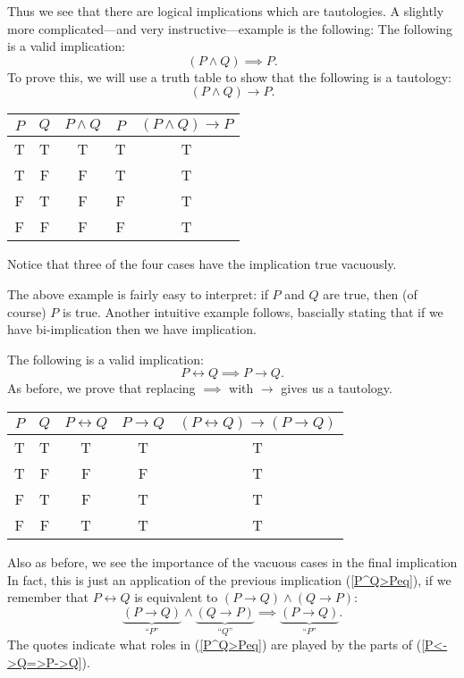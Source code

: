 Thus we see that there are logical 
%
implications which are 
%
tautologies.  A slightly 
more complicated---and very instructive---example is the following: 
\bex The following is a valid implication: 
\begin{equation}(P\wedge Q)\implies P.\label{P^Q>Peq}\end{equation}    
To prove this, we will
use a truth table to show that the following is a tautology:
$$(P\wedge Q)\longrightarrow P.$$ 
\begin{center}
{\rm
\begin{tabular}{|c|c||c|c|c|}
\hline $P$& $Q$ &$P\wedge Q$&$P$& $(P\wedge Q)\longrightarrow P$\\
\hline
T&T&T&T&T\\
T&F&F&T&T\\
F&T&F&F&T\\
F&F&F&F&T\\ \hline\end{tabular}}
\end{center}
Notice that three of the four cases  have the implication true
vacuously.
\label{P^Q>Pex}\eex

The above example is fairly easy to interpret:  if $P$ and $Q$ are true,
then (of course) $P$ is true.  Another intuitive example follows, bascially 
stating that if we have bi-implication then we have implication.

\bex The following is a valid implication:
  \begin{equation} P\longleftrightarrow Q\implies P\longrightarrow Q.
  \label{P<->Q=>P->Q}\end{equation}
As before, we prove that replacing $\implies$ with $\longrightarrow$
gives us a tautology.
\begin{center}
{\rm
\begin{tabular}{|c|c||c|c|c|}
\hline
$P$&$Q$&$P\longleftrightarrow Q$&$P\longrightarrow Q$
    &$(P\longleftrightarrow Q)\longrightarrow(P\longrightarrow Q)$\\
\hline
T&T&T&T&T\\
T&F&F&F&T\\
F&T&F&T&T\\
F&F&T&T&T\\\hline
\end{tabular}}
\end{center}
Also as
before, we see the importance of the vacuous cases in the final implication
In fact, this is just an application of the previous implication
(\ref{P^Q>Peq}), if we remember that
$P\longleftrightarrow Q$ is equivalent to 
$(P\longrightarrow Q)\wedge(Q\longrightarrow P)$:
$$\underbrace{(P\longrightarrow Q)}_{\text{``$P$''}}
\wedge\underbrace{(Q\longrightarrow P)}_{\text{``$Q$''}}\implies
\underbrace{(P\longrightarrow Q)}_{\text{``$P$''}}.$$
The quotes indicate what roles in (\ref{P^Q>Peq}) are
played by the parts of (\ref{P<->Q=>P->Q}).
\eex


